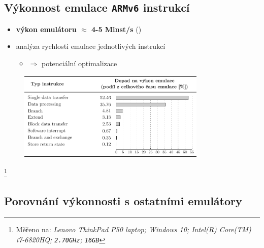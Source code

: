 \documentclass[compress]{beamer}
\begin{document}
\subsection{Výkonnost emulace \texttt{ARMv6} instrukcí}

\begin{frame}
	\begin{itemize}
		\item \textbf{výkon emulátoru $\approx$ 4-5 Minst/s} (\href{https://github.com/MartinUbl/KIV-RTOS}{})
		\item analýza rychlosti emulace jednotlivých instrukcí
		\begin{itemize}
			\item $\Rightarrow$ potenciální optimalizace
		\end{itemize}
	\end{itemize}
	\begin{figure}
		\centering
		\includegraphics[width=0.8\textwidth]{img/performance_2_cz.pdf}
	\end{figure}
	\footnote{\tiny Měřeno na: \textit{Lenovo ThinkPad P50 laptop; Windows 10; \newline Intel(R) Core(TM) i7-6820HQ; \texttt{2.70GHz}; \texttt{16GB}} \vspace{0.5cm}}
\end{frame}

\subsection{Porovnání výkonnosti s ostatními emulátory}
\end{document}
